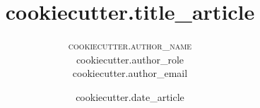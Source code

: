 \setlength{\droptitle}{-4\baselineskip} %

\pretitle{\begin{center}\Huge\bfseries} %
\posttitle{\end{center}} %
\title{
  {{cookiecutter.title_article}}
} %
\author{
\textsc{
	  {{cookiecutter.author_name}}
}\\[1ex] %
\normalsize {{cookiecutter.author_role}} \\
\normalsize {{cookiecutter.author_email}}
}

\date{
  {{cookiecutter.date_article}}
} %

\renewcommand{\maketitlehookd}{
\begin{abstract}
	Lorem ipsum dolor sit amet, consectetur adipiscing elit. Proin cursus
	aliquam turpis, et vulputate arcu laoreet ac. Donec nec metus ornare leo
	tempor vehicula. Nam sit amet porttitor felis. Sed tristique ullamcorper
	imperdiet. Nulla rhoncus vestibulum dolor sit amet mattis. Donec nisi
	quam, venenatis vitae sem id, ullamcorper sollicitudin elit. Curabitur
	maximus velit tempus felis scelerisque, nec mattis est tincidunt.
	Pellentesque nec cursus quam. Ut in lacus vitae enim egestas dignissim.
\end{abstract}
}


